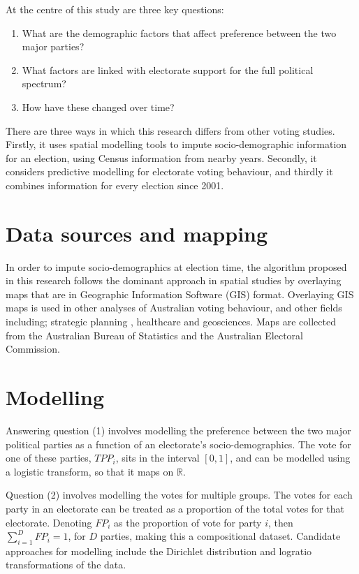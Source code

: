 \documentclass{monashthesis}
\theoremstyle{definition}
\theoremstyle{definition}
\theoremstyle{definition}
\theoremstyle{remark}
\begin{document}
At the centre of this study are three key questions:

\begin{enumerate}
\def\labelenumi{\arabic{enumi}.}
\item
  What are the demographic factors that affect preference between the
  two major parties?
\item
  What factors are linked with electorate support for the full political
  spectrum?
\item
  How have these changed over time?
\end{enumerate}

There are three ways in which this research differs from other voting
studies. Firstly, it uses spatial modelling tools to impute
socio-demographic information for an election, using Census information
from nearby years. Secondly, it considers predictive modelling for
electorate voting behaviour, and thirdly it combines information for
every election since 2001.

\section{Data sources and mapping}\label{data-sources-and-mapping}

In order to impute socio-demographics at election time, the algorithm
proposed in this research follows the dominant approach in spatial
studies by overlaying maps that are in Geographic Information Software
(GIS) format. Overlaying GIS maps is used in other analyses of
Australian voting behaviour, and other fields including; strategic
planning \autocite{Valcik12}, healthcare \autocite{Ye17} and
geosciences. Maps are collected from the Australian Bureau of Statistics
and the Australian Electoral Commission.

\section{Modelling}\label{modelling}

Answering question (1) involves modelling the preference between the two
major political parties as a function of an electorate's
socio-demographics. The vote for one of these parties, \(TPP_i\), sits
in the interval \([0,1]\), and can be modelled using a logistic
transform, so that it maps on \(\mathbb{R}\).

Question (2) involves modelling the votes for multiple groups. The votes
for each party in an electorate can be treated as a proportion of the
total votes for that electorate. Denoting \(FP_i\) as the proportion of
vote for party \(i\), then \(\sum_{i=1}^D FP_i = 1\), for \(D\) parties,
making this a compositional dataset. Candidate approaches for modelling
include the Dirichlet distribution and logratio transformations of the
data.
\end{document}
